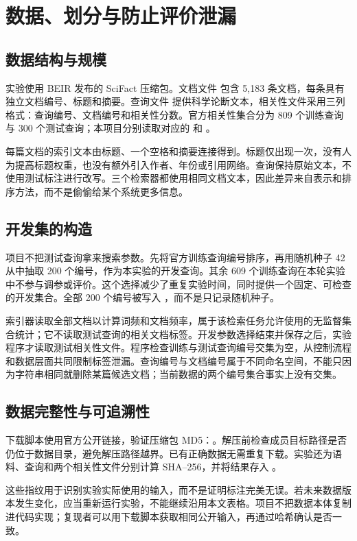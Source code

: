 \documentclass[sigconf,nonacm]{acmart}
\begin{document}
\section{数据、划分与防止评价泄漏}
\subsection{数据结构与规模}
实验使用 BEIR 发布的 SciFact 压缩包。文档文件  包含 5,183 条文档，每条具有独立文档编号、标题和摘要。查询文件  提供科学论断文本，相关性文件采用三列格式：查询编号、文档编号和相关性分数。官方相关性集合分为 809 个训练查询与 300 个测试查询；本项目分别读取对应的  和 。

每篇文档的索引文本由标题、一个空格和摘要连接得到。标题仅出现一次，没有人为提高标题权重，也没有额外引入作者、年份或引用网络。查询保持原始文本，不使用测试标注进行改写。三个检索器都使用相同文档文本，因此差异来自表示和排序方法，而不是偷偷给某个系统更多信息。

\subsection{开发集的构造}
项目不把测试查询拿来搜索参数。先将官方训练查询编号排序，再用随机种子 42 从中抽取 200 个编号，作为本实验的开发查询。其余 609 个训练查询在本轮实验中不参与调参或评价。这个选择减少了重复实验时间，同时提供一个固定、可检查的开发集合。全部 200 个编号被写入 ，而不是只记录随机种子。

索引器读取全部文档以计算词频和文档频率，属于该检索任务允许使用的无监督集合统计；它不读取测试查询的相关文档标签。开发参数选择结束并保存之后，实验程序才读取测试相关性文件。程序检查训练与测试查询编号交集为空，从控制流程和数据层面共同限制标签泄漏。查询编号与文档编号属于不同命名空间，不能只因为字符串相同就删除某篇候选文档；当前数据的两个编号集合事实上没有交集。

\subsection{数据完整性与可追溯性}
下载脚本使用官方公开链接，验证压缩包 MD5：。解压前检查成员目标路径是否仍位于数据目录，避免解压路径越界。已有正确数据无需重复下载。实验还为语料、查询和两个相关性文件分别计算 SHA--256，并将结果存入 。

这些指纹用于识别实验实际使用的输入，而不是证明标注完美无误。若未来数据版本发生变化，应当重新运行实验，不能继续沿用本文表格。项目不把数据本体复制进代码实现；复现者可以用下载脚本获取相同公开输入，再通过哈希确认是否一致。
\end{document}
